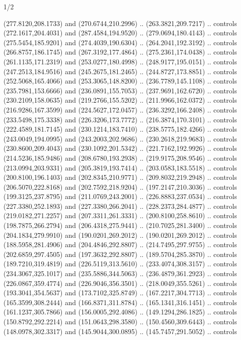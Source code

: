 \begin{flagdescription}{1/2}
\begin{scope}[xshift=0.25\flaglength,yshift=0.5\flagwidth,scale=\flagwidth/227.6]
\begin{scope}[xshift=-35mm,yshift=35.7mm,y=0.4065pt, x=0.4065pt, yscale=-1]
  (277.8120,208.1733) and (270.6744,210.2996) .. (263.3821,209.7217) .. controls
  (272.1617,204.4031) and (287.4584,194.9520) .. (279.0694,180.4143) .. controls
  (275.5454,185.9201) and (274.4039,190.6304) .. (264.2041,192.3192) .. controls
  (266.8757,186.1745) and (267.3192,177.4864) .. (275.2361,174.0438) .. controls
  (261.1135,171.2319) and (253.0277,180.4998) .. (248.9177,195.0151) .. controls
  (247.2513,184.9516) and (245.2675,181.2465) .. (244.8727,173.8851) .. controls
  (252.5068,165.4066) and (253.3065,148.8200) .. (236.7789,145.1108) .. controls
  (235.7981,153.6666) and (236.0891,155.7053) .. (237.9691,162.6720) .. controls
  (230.2109,158.0635) and (219.2766,155.5202) .. (211.9966,162.0372) .. controls
  (216.9286,167.3599) and (224.5627,172.0457) .. (236.3292,166.2408) .. controls
  (233.5498,175.3338) and (226.3206,173.7772) .. (216.3874,170.3101) .. controls
  (222.4589,181.7145) and (230.1214,183.7410) .. (238.5775,182.4266) .. controls
  (243.0049,194.0995) and (243.2003,202.9686) .. (230.2618,219.9683) .. controls
  (230.8600,209.4043) and (230.1092,201.5342) .. (221.7162,192.9926) .. controls
  (214.5236,185.9486) and (208.6780,193.2938) .. (219.9175,208.9546) .. controls
  (213.0994,203.9331) and (205.3819,193.7414) .. (203.0583,183.5518) .. controls
  (200.8100,196.1403) and (202.8345,210.9771) .. (209.8032,219.2948) .. controls
  (206.5070,222.8168) and (202.7592,218.9204) .. (197.2147,210.3036) .. controls
  (199.3125,237.8795) and (211.0769,243.2001) .. (226.8883,237.0534) .. controls
  (227.3380,252.1893) and (227.3380,266.2041) .. (228.2373,284.4877) .. controls
  (219.0182,271.2257) and (207.3311,261.3331) .. (200.8100,258.8610) .. controls
  (198.7875,266.2794) and (206.4318,275.9441) .. (210.7025,281.3400) .. controls
  (204.1834,279.9910) and (190.0201,269.2012) .. (190.0201,269.2012) .. controls
  (188.5958,281.4906) and (204.4846,292.8807) .. (214.7495,297.9755) .. controls
  (202.6859,297.4505) and (197.3632,292.8807) .. (189.5704,285.3870) .. controls
  (189.7210,319.4819) and (226.5119,313.5610) .. (233.4074,308.3157) .. controls
  (234.3067,325.1017) and (235.5886,344.5063) .. (236.4879,361.2923) .. controls
  (226.0867,359.4774) and (226.9046,356.3501) .. (218.0049,355.5261) .. controls
  (193.3041,354.5637) and (173.7102,325.8749) .. (167.2217,304.7713) .. controls
  (165.3599,308.2444) and (166.8371,311.8784) .. (165.1341,316.1451) .. controls
  (161.1237,305.7866) and (156.0005,292.4086) .. (149.1294,286.1825) .. controls
  (150.8792,292.2214) and (151.0643,298.3580) .. (150.4560,309.6443) .. controls
  (148.0978,302.3317) and (145.9044,300.0895) .. (145.7457,291.5052) .. controls

\end{scope}
\end{scope}
\end{flagdescription}

